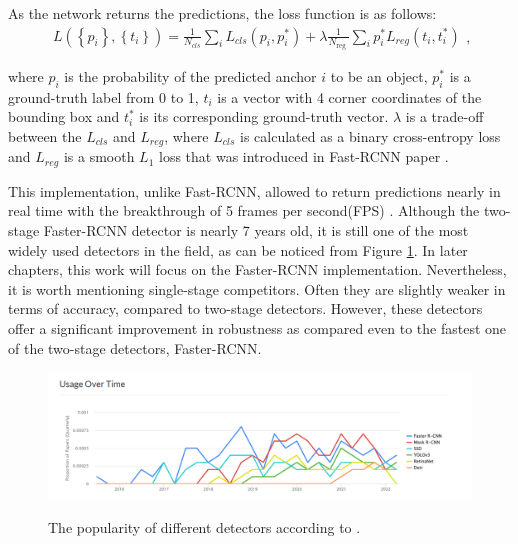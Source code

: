 As the network returns the predictions, the loss function is as follows:  
\begin{equation}
\begin{array}{r}
L\left(\left\{p_{i}\right\},\left\{t_{i}\right\}\right)=\frac{1}{N_{c l s}} \sum_{i} L_{c l s}\left(p_{i}, p_{i}^{*}\right) + \lambda \frac{1}{N_{\text {reg }}} \sum_{i} p_{i}^{*} L_{r e g}\left(t_{i}, t_{i}^{*}\right)
\end{array},
\label{faster_rcnn_loss} 
\end{equation}

where $p_i$ is the probability of the predicted anchor $i$ to be an object,  $p_{i}^{*}$ is a ground-truth label from 0 to 1, $t_i$ is a vector with 4 corner coordinates of the bounding box and $t_{i}^{*}$ is its corresponding ground-truth vector. $\lambda$ is a trade-off between the $L_{cls}$ and $L_{reg}$, where $L_{c l s}$ is calculated as a binary cross-entropy loss and $L_{reg}$ is a smooth $L_1$ loss that was introduced in Fast-RCNN paper \cite{Girshick2015}.  




This implementation, unlike Fast-RCNN, allowed to return predictions nearly in real time with the breakthrough of 5 frames per second(FPS) \cite{ima}.
Although the two-stage Faster-RCNN detector is nearly 7 years old, it is still one of the most widely used detectors in the field, as can be noticed from Figure \ref{popularity}. In later chapters, this work will focus on the Faster-RCNN implementation. Nevertheless, it is worth mentioning single-stage competitors. Often they are slightly weaker in terms of accuracy, compared to two-stage detectors. However, these detectors offer a significant improvement in robustness as compared even to the fastest one of the two-stage detectors, Faster-RCNN. 

\begin{figure}[htb]
	\begin{center}
		\includegraphics[width=14cm]{./detectorsPopularity.png}
	\end{center}
	\caption{The popularity of different detectors according to  \cite{paperswithcode_1:2022}.}
	\begin{center}
		\label{popularity}
	\end{center}
\end{figure}

